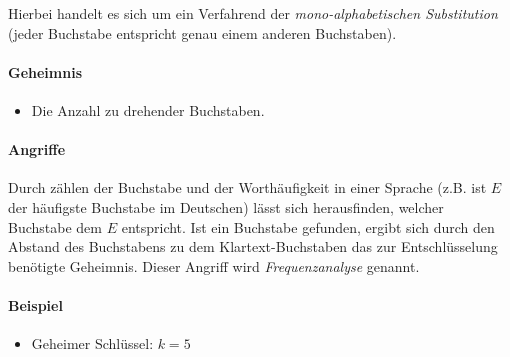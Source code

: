                     Hierbei handelt es sich um ein Verfahrend der \textit{mono-alphabetischen Substitution} (jeder Buchstabe entspricht genau einem anderen Buchstaben).
                
                \paragraph{Geheimnis}
                    \begin{itemize}
                    	\item Die Anzahl zu drehender Buchstaben.
                    \end{itemize}
                
                \paragraph{Angriffe}
                    Durch zählen der Buchstabe und der Worthäufigkeit in einer Sprache (z.B. ist \(E\) der häufigste Buchstabe im Deutschen) lässt sich herausfinden, welcher Buchstabe dem \(E\) entspricht. Ist ein Buchstabe gefunden, ergibt sich durch den Abstand des Buchstabens zu dem Klartext-Buchstaben das zur Entschlüsselung benötigte Geheimnis. Dieser Angriff wird \textit{Frequenzanalyse} genannt.
                
                \paragraph{Beispiel}
                    \begin{itemize}
                    	\item Geheimer Schlüssel: \tabto{5cm} \( k = 5 \)
                    \end{itemize}
                
